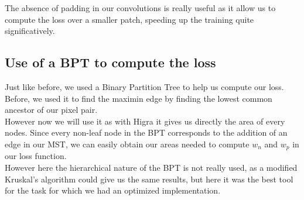 The absence of padding in our convolutions is really useful as it allow us to
compute the loss over a smaller patch, speeding up the training quite
significatively.

\subsection{Use of a BPT to compute the loss}

Just like before, we used a Binary Partition Tree to help us compute our
loss.\\
Before, we used it to find the maximin edge by finding the lowest common
ancestor of our pixel pair.\\

However now we will use it as with Higra it gives us directly the area of
every nodes. Since every non-leaf node in the BPT corresponds to the addition
of an edge in our MST, we can easily obtain our areas needed to compute $w_n$
and $w_p$ in our loss function.\\

However here the hierarchical nature of the BPT is not really used, as a
modified Kruskal's algorithm could give us the same results, but here it was
the best tool for the task for which we had an optimized implementation.

